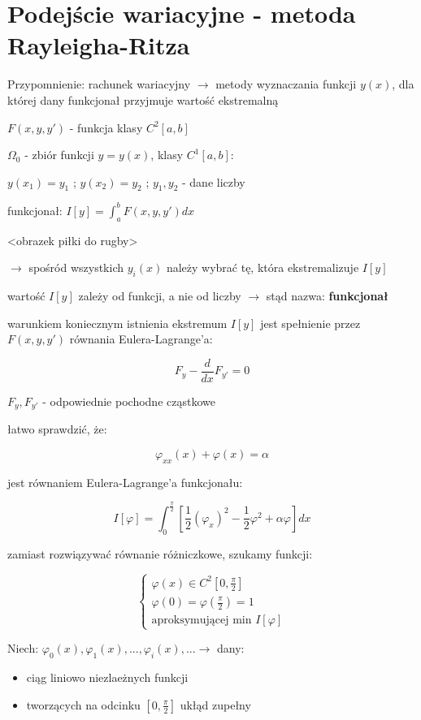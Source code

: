 \section{Podejście wariacyjne - metoda Rayleigha-Ritza}

Przypomnienie:
rachunek wariacyjny $\rightarrow$ metody wyznaczania funkcji $y(x)$, dla której dany funkcjonał przyjmuje wartość ekstremalną

$F(x,y,y')$ - funkcja klasy $C^2[a,b]$

$\Omega_0$ - zbiór funkcji $y = y(x)$, klasy $C^1[a,b]$:

$y(x_1) = y_1$ ; $y(x_2) = y_2$ ; $y_1, y_2$ - dane liczby

funkcjonał:
$I[y] = \int_a^b F(x,y,y') dx$

<obrazek piłki do rugby>

$\rightarrow$ spośród wszystkich $y_i(x)$ należy wybrać tę, która ekstremalizuje $I[y]$

wartość $I[y]$ zależy od funkcji, a nie od liczby $\rightarrow$ stąd nazwa: \textbf{funkcjonał}

warunkiem koniecznym istnienia ekstremum $I[y]$ jest spełnienie przez $F(x,y,y')$ równania Eulera-Lagrange'a:

$$
F_y - \frac{d}{dx} F_{y'} = 0
$$

$F_y , F_{y'}$ - odpowiednie pochodne cząstkowe

łatwo sprawdzić, że:

$$
\varphi_{xx}(x) + \varphi(x) = \alpha
$$

jest równaniem Eulera-Lagrange'a funkcjonału:

$$
I[\varphi] = \int_0^{\frac{\pi}{2}} [\frac{1}{2}(\varphi_x)^2 - \frac{1}{2}\varphi^2 + \alpha \varphi] dx
$$

zamiast rozwiązywać równanie różniczkowe, szukamy funkcji:

$$
\begin{cases}
	\varphi(x) \in C^2[0, \frac{\pi}{2}] \\
	\varphi(0) = \varphi(\frac{\pi}{2}) = 1 \\
	\text{aproksymującej min } I[\varphi]
\end{cases}
$$

Niech: $\varphi_0(x), \varphi_1(x), ... , \varphi_i(x), ... \rightarrow$ dany:
\begin{itemize}
	\item ciąg liniowo niezlaeżnych funkcji
	\item tworzących na odcinku $[0, \frac{\pi}{2}]$ ukłąd zupełny
\end{itemize}

